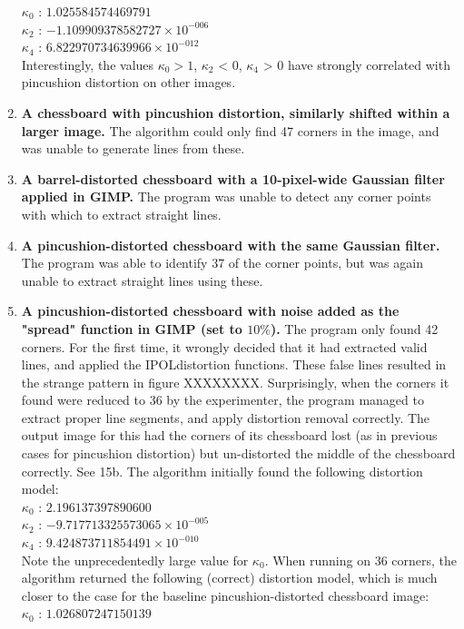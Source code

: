 \begin{enumerate}
   $ \kappa_{0}$ : $1.025584574469791$\\
   $ \kappa_{2}$ : $-1.109909378582727 \times 10^{-006}$\\
   $ \kappa_{4}$ : $6.822970734639966 \times 10^{-012}$\\
   Interestingly, the values $\kappa_{0} > 1$, $\kappa_{2}$ < 0, $\kappa_{4}$ > 0 have strongly correlated with pincushion distortion on other images.
  \item \textbf{A chessboard with pincushion distortion, similarly shifted within a larger image.} The algorithm could only find 47 corners in the image, and was unable to generate lines from these.
  \item \textbf{A barrel-distorted chessboard with a 10-pixel-wide Gaussian filter applied in GIMP.} The program was unable to detect any corner points with which to extract straight lines.
  \item \textbf{A pincushion-distorted chessboard with the same Gaussian filter.} The program was able to identify 37 of the corner points, but was again unable to extract straight lines using these.
  \item \textbf{A pincushion-distorted chessboard with noise added as the "spread" function in GIMP (set to $10\%$).} The program only found 42 corners. For the first time, it wrongly decided that it had extracted valid lines, and applied the IPOLdistortion functions. These false lines resulted in the strange pattern in figure XXXXXXXX. Surprisingly, when the corners it found were reduced to 36 by the experimenter, the program managed to extract proper line segments, and apply distortion removal correctly. The output image for this had the corners of its chessboard lost (as in previous cases for pincushion distortion) but un-distorted the middle of the chessboard correctly. See 15b. The algorithm initially found the following distortion model:\\
   $ \kappa_{0}$ : $2.196137397890600$\\
   $ \kappa_{2}$ : $-9.717713325573065 \times 10^{-005}$\\
   $ \kappa_{4}$ : $9.424873711854491 \times 10^{-010}$\\
Note the unprecedentedly large value for $\kappa_{0}$. When running on 36 corners, the algorithm returned the following (correct) distortion model, which is much closer to the case for the baseline pincushion-distorted chessboard image:\\
   $ \kappa_{0}$ : $1.026807247150139$\\

\end{enumerate}
